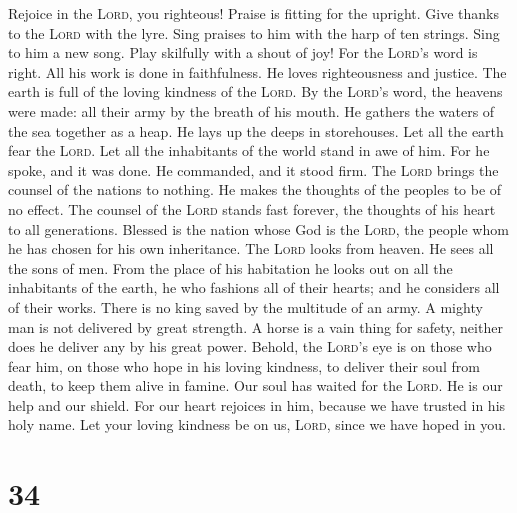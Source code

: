  Rejoice in the \textsc{Lord}, you righteous! Praise is
fitting for the upright.  Give thanks to the \textsc{Lord}
with the lyre. Sing praises to him with the harp of ten strings.
 Sing to him a new song. Play skilfully with a shout of
joy!  For the \textsc{Lord}'s word is right. All his work
is done in faithfulness.  He loves righteousness and
justice. The earth is full of the loving kindness of the \textsc{Lord}.
 By the \textsc{Lord}'s word, the heavens were made: all
their army by the breath of his mouth.  He gathers the
waters of the sea together as a heap. He lays up the deeps in
storehouses.  Let all the earth fear the \textsc{Lord}.
Let all the inhabitants of the world stand in awe of him. 
For he spoke, and it was done. He commanded, and it stood firm.
 The \textsc{Lord} brings the counsel of the nations to
nothing. He makes the thoughts of the peoples to be of no effect.
 The counsel of the \textsc{Lord} stands fast forever,
the thoughts of his heart to all generations.  Blessed is
the nation whose God is the \textsc{Lord}, the people whom he has chosen
for his own inheritance.  The \textsc{Lord} looks from
heaven. He sees all the sons of men.  From the place of
his habitation he looks out on all the inhabitants of the earth,
 he who fashions all of their hearts; and he considers
all of their works.  There is no king saved by the
multitude of an army. A mighty man is not delivered by great strength.
 A horse is a vain thing for safety, neither does he
deliver any by his great power.  Behold, the
\textsc{Lord}'s eye is on those who fear him, on those who hope in his
loving kindness,  to deliver their soul from death, to
keep them alive in famine.  Our soul has waited for the
\textsc{Lord}. He is our help and our shield.  For our
heart rejoices in him, because we have trusted in his holy name.
 Let your loving kindness be on us, \textsc{Lord}, since
we have hoped in you.

\hypertarget{section-33}{%
\section{34}\label{section-33}}

